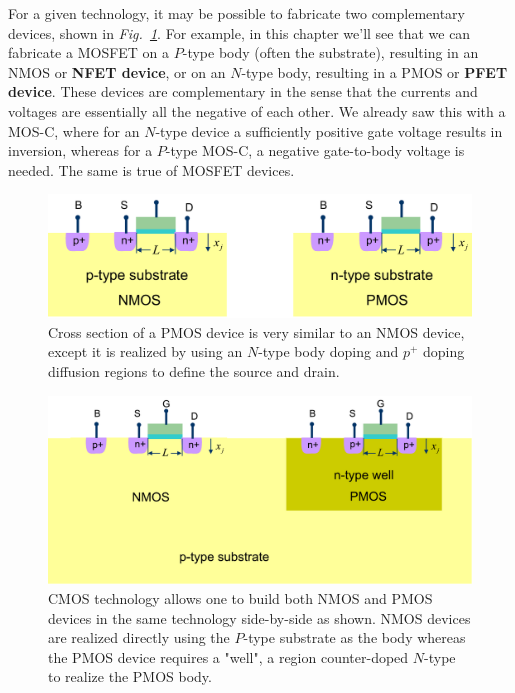 For a given technology, it may be possible to fabricate two complementary devices, shown in \emph{Fig.~\ref{fig:pmos_xsect}}.  For example, in this chapter we'll see that we can fabricate a MOSFET on a $P$-type body (often the substrate), resulting in an NMOS or \textbf{NFET device}, or on an $N$-type body, resulting in a PMOS or \textbf{PFET device}.  These devices are complementary in the sense that the currents and voltages are essentially all the negative of each other.  We already saw this with a MOS-C, where for an $N$-type device a sufficiently positive gate voltage results in inversion, whereas for a $P$-type MOS-C, a negative gate-to-body voltage is needed. The same is true of MOSFET devices.
\begin{figure}[H]
\centering
\includegraphics[width=\columnwidth]{pmos_xsect}
\caption{Cross section of a PMOS device is very similar to an NMOS device, except it is realized by using an $N$-type body doping and $p^+$ doping diffusion regions to define the source and drain.}
\label{fig:pmos_xsect}
\end{figure}
\newpage
\begin{figure}[t]
\centering
\includegraphics[width=\columnwidth]{cmos_xsect}
\caption{CMOS technology allows one to build both NMOS and PMOS devices in the same technology side-by-side as shown.  NMOS devices are realized directly using the $P$-type substrate as the body whereas the PMOS device requires a "well", a region counter-doped $N$-type to realize the PMOS body.}
\label{fig:cmos_xsect}
\end{figure}
